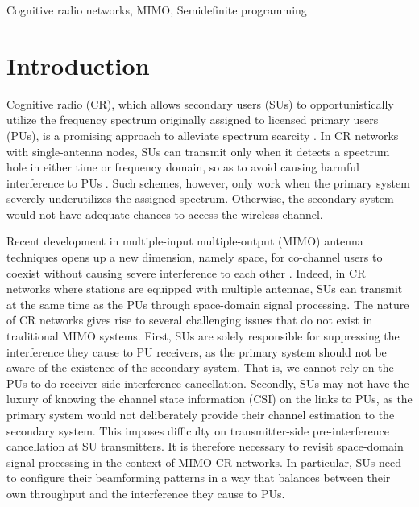 \documentclass[twocolumn,10pt]{IEEEtran}
\theoremstyle{plain} \newtheorem{theorem}{Theorem}
\theoremstyle{plain} \newtheorem{proposition}{Proposition}
\theoremstyle{plain} \newtheorem{corollary}{Corollary}
\theoremstyle{remark} \newtheorem{remark}{Remark}
\theoremstyle{remark} \newtheorem{lemma}{Lemma}
\theoremstyle{plain} \newtheorem{definition}{Definition}
\theoremstyle{plain} \newtheorem{assumption}{Assumption}
\theoremstyle{plain} \newtheorem{fact}{Fact}
\begin{document}
\begin{IEEEkeywords}
Cognitive radio networks, MIMO, Semidefinite programming
\end{IEEEkeywords}



\section{Introduction}
Cognitive radio (CR), which allows secondary users (SUs) to opportunistically utilize the frequency spectrum originally assigned to licensed primary users (PUs), is a promising approach to alleviate spectrum scarcity \cite{H05}. In CR networks with single-antenna nodes, SUs can transmit only when it detects a spectrum hole in either time or frequency domain, so as to avoid causing harmful interference to PUs \cite{P09,TMS09}. Such schemes, however, only work when the primary system severely underutilizes the assigned spectrum. Otherwise, the secondary system would not have adequate chances to access the wireless channel.

Recent development in multiple-input multiple-output (MIMO) antenna techniques opens up a new dimension, namely space, for co-channel users to coexist without causing severe interference to each other \cite{GSS+03}. Indeed, in CR networks where stations are equipped with multiple antennae, SUs can transmit at the same time as the PUs through space-domain signal processing. The nature of CR networks gives rise to several challenging issues that do not exist in traditional MIMO systems. First, SUs are solely responsible for suppressing the interference they cause to PU receivers, as the primary system should not be aware of the existence of the secondary system. That is, we cannot rely on the PUs to do receiver-side interference cancellation.  Secondly, SUs may not have the luxury of knowing the channel state information (CSI) on the links to PUs, as the primary system would not deliberately provide their channel estimation to the secondary system. This imposes difficulty on transmitter-side pre-interference cancellation at SU transmitters. It is therefore necessary to revisit space-domain signal processing in the context of MIMO CR networks. In particular,  SUs need to configure their beamforming patterns in a way that balances between their own throughput and the interference they cause to PUs.
\end{document}
